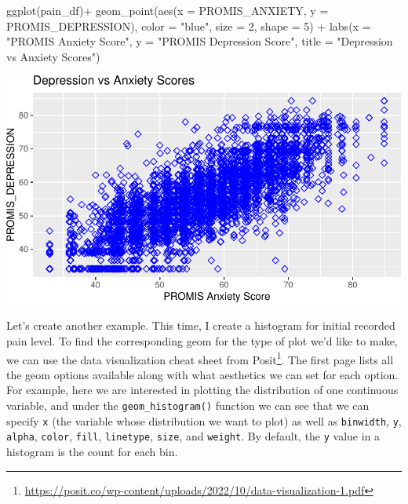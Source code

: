 \documentclass[
  letterpaper,
]{latex/krantz}
\makeatletter
\newenvironment{Shaded}{\begin{snugshade}}{\end{snugshade}}
\newcommand{\AttributeTok}[1]{\textcolor[rgb]{0.40,0.45,0.13}{#1}}
\newcommand{\DecValTok}[1]{\textcolor[rgb]{0.68,0.00,0.00}{#1}}
\newcommand{\FunctionTok}[1]{\textcolor[rgb]{0.28,0.35,0.67}{#1}}
\newcommand{\NormalTok}[1]{\textcolor[rgb]{0.00,0.23,0.31}{#1}}
\newcommand{\SpecialCharTok}[1]{\textcolor[rgb]{0.37,0.37,0.37}{#1}}
\newcommand{\StringTok}[1]{\textcolor[rgb]{0.13,0.47,0.30}{#1}}
\renewcommand{\href}[2]{#2\footnote{\url{#1}}}
\newenvironment{kframe}{%
\medskip{}
\setlength{\fboxsep}{.8em}
 \def\at@end@of@kframe{}%
 \ifinner\ifhmode%
  \def\at@end@of@kframe{\end{minipage}}%
  \begin{minipage}{\columnwidth}%
 \fi\fi%
 \def\FrameCommand##1{\hskip\@totalleftmargin \hskip-\fboxsep
 \colorbox{shadecolor}{##1}\hskip-\fboxsep
     \hskip-\linewidth \hskip-\@totalleftmargin \hskip\columnwidth}%
 \MakeFramed {\advance\hsize-\width
   \@totalleftmargin\z@ \linewidth\hsize
   \@setminipage}}%
 {\par\unskip\endMakeFramed%
 \at@end@of@kframe}
\renewenvironment{Shaded}{\begin{kframe}}{\end{kframe}}
\makeatother
\begin{document}
\begin{Shaded}
\begin{Highlighting}[]
\FunctionTok{ggplot}\NormalTok{(pain\_df)}\SpecialCharTok{+}
  \FunctionTok{geom\_point}\NormalTok{(}\FunctionTok{aes}\NormalTok{(}\AttributeTok{x =}\NormalTok{ PROMIS\_ANXIETY, }\AttributeTok{y =}\NormalTok{ PROMIS\_DEPRESSION), }
             \AttributeTok{color =} \StringTok{"blue"}\NormalTok{, }\AttributeTok{size =} \DecValTok{2}\NormalTok{, }\AttributeTok{shape =} \DecValTok{5}\NormalTok{) }\SpecialCharTok{+} 
  \FunctionTok{labs}\NormalTok{(}\AttributeTok{x =} \StringTok{"PROMIS Anxiety Score"}\NormalTok{, }\AttributeTok{y =} \StringTok{"PROMIS Depression Score"}\NormalTok{, }
       \AttributeTok{title =} \StringTok{"Depression vs Anxiety Scores"}\NormalTok{)}
\end{Highlighting}
\end{Shaded}

\begin{center}
\includegraphics[width=1\textwidth,height=\textheight]{book/visualization_ggplot_files/figure-pdf/unnamed-chunk-5-1.pdf}
\end{center}

Let's create another example. This time, I create a histogram for
initial recorded pain level. To find the corresponding geom for the type
of plot we'd like to make, we can use the
\href{https://posit.co/wp-content/uploads/2022/10/data-visualization-1.pdf}{data
visualization cheat sheet from Posit}. The first page lists all the geom
options available along with what aesthetics we can set for each option.
For example, here we are interested in plotting the distribution of one
continuous variable, and under the
\texttt{geom\_histogram()}
function we can see that we can specify \texttt{x} (the variable whose
distribution we want to plot) as well as \texttt{binwidth}, \texttt{y},
\texttt{alpha}, \texttt{color}, \texttt{fill}, \texttt{linetype},
\texttt{size}, and \texttt{weight}. By default, the \texttt{y} value in
a histogram is the count for each bin.
\end{document}
